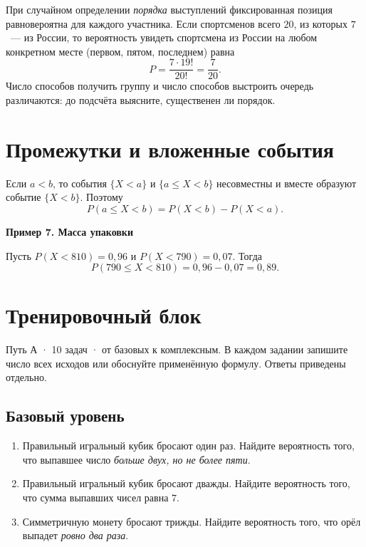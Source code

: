 \documentclass[a4paper,12pt]{article}
\newcommand{\ex}[1]{\par\smallskip\textcolor{accent}{\bfseries #1}\par\smallskip}
\begin{document}
При случайном определении \emph{порядка} выступлений фиксированная позиция равновероятна для каждого участника. Если спортсменов всего $20$, из которых $7$~--- из России, то вероятность увидеть спортсмена из России на любом конкретном месте (первом, пятом, последнем) равна
\[
P=\frac{7\cdot19!}{20!}=\frac7{20}.
\]
\textcolor{softgray}{Число способов получить группу и число способов выстроить очередь различаются: до подсчёта выясните, существенен ли порядок.}

\section{Промежутки и вложенные события}
Если $a<b$, то события $\{X<a\}$ и $\{a\le X<b\}$ несовместны и вместе образуют событие $\{X<b\}$. Поэтому
\[
\boxed{P(a\le X<b)=P(X<b)-P(X<a).}
\]
\begin{center}
\end{center}
\ex{Пример 7. Масса упаковки}
Пусть $P(X<810)=0{,}96$ и $P(X<790)=0{,}07$. Тогда
\[
P(790\le X<810)=0{,}96-0{,}07=0{,}89.
\]

\clearpage
\section*{Тренировочный блок}
\textcolor{softgray}{Путь А · 10 задач · от базовых к комплексным. В каждом задании запишите число всех исходов или обоснуйте применённую формулу. Ответы приведены отдельно.}
\subsection*{Базовый уровень}
\begin{enumerate}[label=\textcolor{darkaccent}{\bfseries \arabic*.},ref=\arabic*]
\item Правильный игральный кубик бросают один раз. Найдите вероятность того, что выпавшее число \emph{больше двух, но не более пяти}.
\item Правильный игральный кубик бросают дважды. Найдите вероятность того, что сумма выпавших чисел равна $7$.
\item Симметричную монету бросают трижды. Найдите вероятность того, что орёл выпадет \emph{ровно два раза}.
\end{enumerate}
\end{document}
